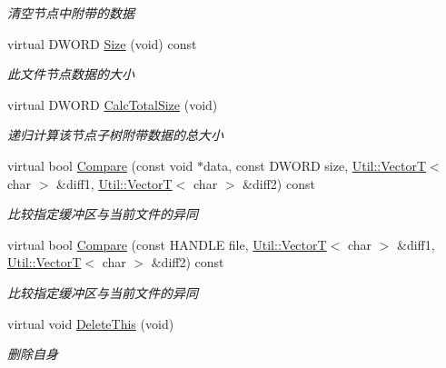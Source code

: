 \begin{DoxyCompactItemize}
\begin{DoxyCompactList}\small\item\em 清空节点中附带的数据 \end{DoxyCompactList}\item 
virtual D\-W\-O\-R\-D \hyperlink{class_file_sys_1_1_file_node_ac66c3549ac94e6ca8e5adde3970f6421}{Size} (void) const 
\begin{DoxyCompactList}\small\item\em 此文件节点数据的大小 \end{DoxyCompactList}\item 
virtual D\-W\-O\-R\-D \hyperlink{class_file_sys_1_1_file_node_acafc6eec61aafcf3e1899c9716ee3629}{Calc\-Total\-Size} (void)
\begin{DoxyCompactList}\small\item\em 递归计算该节点子树附带数据的总大小 \end{DoxyCompactList}\item 
virtual bool \hyperlink{class_file_sys_1_1_file_node_afd998a6e6747f426c856ccdedd21eeb6}{Compare} (const void $\ast$data, const D\-W\-O\-R\-D size, \hyperlink{class_util_1_1_vector_t}{Util\-::\-Vector\-T}$<$ char $>$ \&diff1, \hyperlink{class_util_1_1_vector_t}{Util\-::\-Vector\-T}$<$ char $>$ \&diff2) const 
\begin{DoxyCompactList}\small\item\em 比较指定缓冲区与当前文件的异同 \end{DoxyCompactList}\item 
virtual bool \hyperlink{class_file_sys_1_1_file_node_aa14e75686fe236425f4580763bd75222}{Compare} (const H\-A\-N\-D\-L\-E file, \hyperlink{class_util_1_1_vector_t}{Util\-::\-Vector\-T}$<$ char $>$ \&diff1, \hyperlink{class_util_1_1_vector_t}{Util\-::\-Vector\-T}$<$ char $>$ \&diff2) const 
\begin{DoxyCompactList}\small\item\em 比较指定缓冲区与当前文件的异同 \end{DoxyCompactList}\item 
\hypertarget{class_file_sys_1_1_file_node_aec88555b8c435e277a88d65814fb16eb}{virtual void \hyperlink{class_file_sys_1_1_file_node_aec88555b8c435e277a88d65814fb16eb}{Delete\-This} (void)}\label{class_file_sys_1_1_file_node_aec88555b8c435e277a88d65814fb16eb}

\begin{DoxyCompactList}\small\item\em 删除自身 \end{DoxyCompactList}\end{DoxyCompactItemize}
